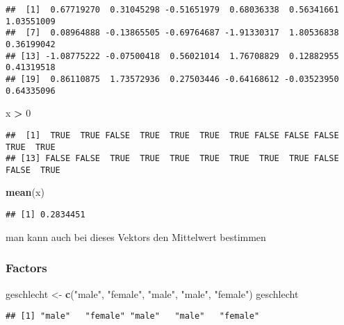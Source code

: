 \documentclass[
]{article}
\newenvironment{Shaded}{\begin{snugshade}}{\end{snugshade}}
\newcommand{\DecValTok}[1]{\textcolor[rgb]{0.00,0.00,0.81}{#1}}
\newcommand{\FunctionTok}[1]{\textcolor[rgb]{0.13,0.29,0.53}{\textbf{#1}}}
\newcommand{\NormalTok}[1]{#1}
\newcommand{\OtherTok}[1]{\textcolor[rgb]{0.56,0.35,0.01}{#1}}
\newcommand{\SpecialCharTok}[1]{\textcolor[rgb]{0.81,0.36,0.00}{\textbf{#1}}}
\newcommand{\StringTok}[1]{\textcolor[rgb]{0.31,0.60,0.02}{#1}}
\begin{document}
\begin{verbatim}
##  [1]  0.67719270  0.31045298 -0.51651979  0.68036338  0.56341661  1.03551009
##  [7]  0.08964888 -0.13865505 -0.69764687 -1.91330317  1.80536838  0.36199042
## [13] -1.08775222 -0.07500418  0.56021014  1.76708829  0.12882955  0.41319518
## [19]  0.86110875  1.73572936  0.27503446 -0.64168612 -0.03523950  0.64335096
\end{verbatim}

\begin{Shaded}
\begin{Highlighting}[]
\NormalTok{x }\SpecialCharTok{\textgreater{}} \DecValTok{0}
\end{Highlighting}
\end{Shaded}

\begin{verbatim}
##  [1]  TRUE  TRUE FALSE  TRUE  TRUE  TRUE  TRUE FALSE FALSE FALSE  TRUE  TRUE
## [13] FALSE FALSE  TRUE  TRUE  TRUE  TRUE  TRUE  TRUE  TRUE FALSE FALSE  TRUE
\end{verbatim}

\begin{Shaded}
\begin{Highlighting}[]
\FunctionTok{mean}\NormalTok{(x)}
\end{Highlighting}
\end{Shaded}

\begin{verbatim}
## [1] 0.2834451
\end{verbatim}

man kann auch bei dieses Vektors den Mittelwert bestimmen

\hypertarget{factors}{%
\subsubsection{Factors}\label{factors}}

\begin{Shaded}
\begin{Highlighting}[]
\NormalTok{geschlecht }\OtherTok{\textless{}{-}} \FunctionTok{c}\NormalTok{(}\StringTok{"male"}\NormalTok{, }\StringTok{"female"}\NormalTok{, }\StringTok{"male"}\NormalTok{, }\StringTok{"male"}\NormalTok{, }\StringTok{"female"}\NormalTok{)}
\NormalTok{geschlecht}
\end{Highlighting}
\end{Shaded}

\begin{verbatim}
## [1] "male"   "female" "male"   "male"   "female"
\end{verbatim}
\end{document}
